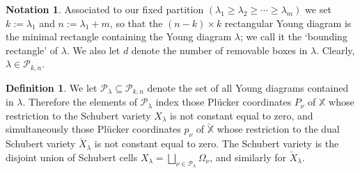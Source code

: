 \documentclass{amsart}
\theoremstyle{definition}
\newtheorem{defn}[thm]{Definition}
\newtheorem{notation}[thm]{Notation}
\numberwithin{equation}{section}
\newcommand{\Shkn}{{\mathcal P_{k,n}}}
\newcommand{\checkX}{\check{X}}
\begin{document}
\begin{notation}\label{n:knd} 
Associated to our fixed partition $(\lambda_1\ge\lambda_2\ge\cdots\ge\lambda_{m})$ we set $k:=\lambda_1$ and $n:=\lambda_1+m$, so that the $(n-k)\times k$ rectangular Young diagram is the minimal rectangle containing the Young diagram $\lambda$; we call it the `bounding rectangle' of $\lambda$. We also let $d$ denote the number of removable boxes in $\lambda$. Clearly, $\lambda\in\Shkn$.
\end{notation}


\begin{defn}
We let $\mathcal{P}_{\lambda}\subseteq\mathcal P_{k,n}$ denote the set of all Young diagrams contained in $\lambda$.
Therefore the elements of $\mathcal{P}_{\lambda}$
index those Pl\"ucker coordinates $P_\nu$ of $\mathbb X$ whose
	restriction to the Schubert variety $X_{\lambda}$ is not constant equal to zero,
and simultaneously those Pl\"ucker coordinates  $p_\nu$ of $\mathbb\checkX$  whose restriction to  the dual Schubert variety $\check{X}_{\lambda}$
 is not constant equal to zero. The Schubert variety is the disjoint union of Schubert cells $X_\lambda=\bigsqcup_{\nu\in\mathcal {P}_\lambda}\Omega_\nu$,  and similarly for $\check{X}_\lambda$.
\end{defn}
\end{document}
